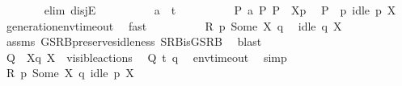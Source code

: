 \begin{isabellebody}
\ \ \ \ \ \ \isamarkupfalse%
\ {\isacharparenleft}{\kern0pt}elim\ disjE{\isacharparenright}{\kern0pt}\isanewline
\ \ \ \ \ \ \ \ \isamarkupfalse%
\ {\isacartoucheopen}a\ {\isacharequal}{\kern0pt}\ t{\isacharunderscore}{\kern0pt}{\isasymepsilon}{\isacartoucheclose}\isanewline
\ \ \ \ \ \ \ \ \isamarkupfalse%
\ {\isacartoucheopen}P\ {\isasymlongmapsto}\isactrlsup {\isasymtheta}a\ P{\isacharprime}{\kern0pt}{\isacartoucheclose}\ {\isacartoucheopen}P\ {\isacharequal}{\kern0pt}\ {\isasymtheta}{\isacharbrackleft}{\kern0pt}X{\isacharbrackright}{\kern0pt}{\isacharparenleft}{\kern0pt}p{\isacharparenright}{\kern0pt}{\isacartoucheclose}\ \isamarkupfalse%
\ {\isacartoucheopen}P{\isacharprime}{\kern0pt}\ {\isacharequal}{\kern0pt}\ {\isasymtheta}{\isacharparenleft}{\kern0pt}p{\isacharparenright}{\kern0pt}{\isacartoucheclose}\ {\isacartoucheopen}idle\ p\ X{\isacartoucheclose}\ \isamarkupfalse%
\ generation{\isacharunderscore}{\kern0pt}env{\isacharunderscore}{\kern0pt}timeout\ \isamarkupfalse%
\ fast{\isacharplus}{\kern0pt}\isanewline
\ \ \ \ \ \ \ \ \isamarkupfalse%
\ {\isacartoucheopen}R\ p\ {\isacharparenleft}{\kern0pt}Some\ X{\isacharparenright}{\kern0pt}\ q{\isacartoucheclose}\ \isamarkupfalse%
\ {\isacartoucheopen}idle\ q\ X{\isacartoucheclose}\isanewline
\ \ \ \ \ \ \ \ \ \ \isamarkupfalse%
\ assms\ GSRB{\isacharunderscore}{\kern0pt}preserves{\isacharunderscore}{\kern0pt}idleness\ SRB{\isacharunderscore}{\kern0pt}is{\isacharunderscore}{\kern0pt}GSRB\ \isamarkupfalse%
\ blast\isanewline
\ \ \ \ \ \ \ \ \isamarkupfalse%
\ {\isacartoucheopen}Q\ {\isacharequal}{\kern0pt}\ {\isasymtheta}{\isacharbrackleft}{\kern0pt}X{\isacharbrackright}{\kern0pt}{\isacharparenleft}{\kern0pt}q{\isacharparenright}{\kern0pt}{\isacartoucheclose}\ {\isacartoucheopen}X\ {\isasymsubseteq}\ visible{\isacharunderscore}{\kern0pt}actions{\isacartoucheclose}\ \isamarkupfalse%
\ {\isacartoucheopen}Q\ {\isasymlongmapsto}\isactrlsup {\isasymtheta}t{\isacharunderscore}{\kern0pt}{\isasymepsilon}\ {\isasymtheta}{\isacharparenleft}{\kern0pt}q{\isacharparenright}{\kern0pt}{\isacartoucheclose}\ \isamarkupfalse%
\ env{\isacharunderscore}{\kern0pt}timeout\ \isamarkupfalse%
\ simp\isanewline
\ \ \ \ \ \ \ \ \isamarkupfalse%
\ {\isacartoucheopen}R\ p\ {\isacharparenleft}{\kern0pt}Some\ X{\isacharparenright}{\kern0pt}\ q{\isacartoucheclose}\ {\isacartoucheopen}idle\ p\ X{\isacartoucheclose}\ \isamarkupfalse%

\end{isabellebody}
